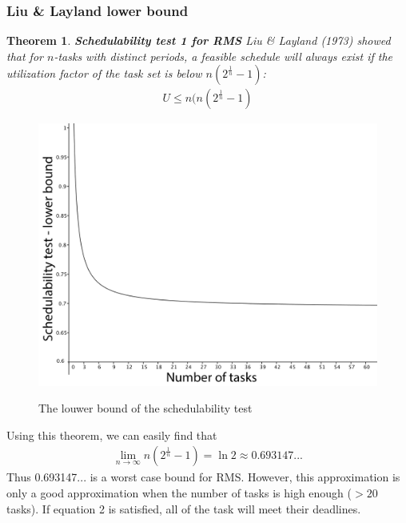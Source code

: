 \documentclass[a4paper,12pt]{article}
\newtheorem{theorem}{Theorem}[section]
\theoremstyle{definition}
\begin{document}
\subsubsection{Liu \& Layland lower bound}\begin{theorem}\textbf{Schedulability test 1 for RMS}
  Liu & Layland (1973) showed that for $n$-tasks with distinct periods, a 
  feasible schedule will always exist if the utilization factor of the task set 
  is below $n(2^{\frac{1}{n}} -1)$:
  \begin{eqnarray}
  U \leq n(n(2^{\frac{1}{n}} -1)
  \end{eqnarray}
\end{theorem}\label{bound}

\begin{figure}
  \centering
  \includegraphics[scale=0.2]{grafkak.png}\\
  \caption{The louwer bound of the schedulability test}\label{scottplane}
\end{figure}
Using this theorem, we can easily find that
\begin{eqnarray}
\lim_{n \rightarrow \infty}   n(2^{\frac{1}{n}} -1) = \ln 2 \approx 
0.693147...
\end{eqnarray}\label{limiet}
Thus 0.693147... is a worst case bound for RMS. However, this approximation is only a good
approximation when the number of tasks is high enough ($> 20$ tasks).
If equation 2 is satisfied, all 
of the task will meet their deadlines.
\begin{figure}

\end{figure}
\end{document}
